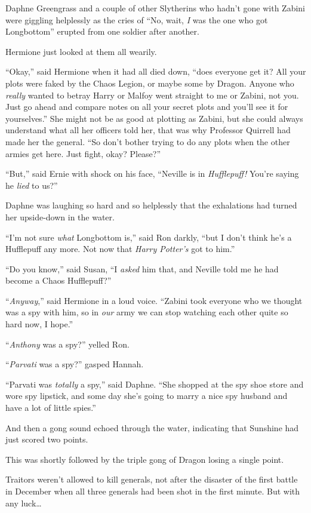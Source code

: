 Daphne Greengrass and a couple of other Slytherins who hadn’t gone with Zabini were giggling helplessly as the cries of “No, wait, \emph{I} was the one who got Longbottom” erupted from one soldier after another.

Hermione just looked at them all wearily.

“Okay,” said Hermione when it had all died down, “does everyone get it? All your plots were faked by the Chaos Legion, or maybe some by Dragon. Anyone who \emph{really} wanted to betray Harry or Malfoy went straight to me or Zabini, not you. Just go ahead and compare notes on all your secret plots and you’ll see it for yourselves.” She might not be as good at plotting as Zabini, but she could always understand what all her officers told her, that was why Professor Quirrell had made her the general. “So don’t bother trying to do any plots when the other armies get here. Just fight, okay? Please?”

“But,” said Ernie with shock on his face, “Neville is in \emph{Hufflepuff!} You’re saying he \emph{lied} to us?”

Daphne was laughing so hard and so helplessly that the exhalations had turned her upside-down in the water.

“I’m not sure \emph{what} Longbottom is,” said Ron darkly, “but I don’t think he’s a Hufflepuff any more. Not now that \emph{Harry Potter’s} got to him.”

“Do you know,” said Susan, “I \emph{asked} him that, and Neville told me he had become a Chaos Hufflepuff?”

“\emph{Anyway},” said Hermione in a loud voice. “Zabini took everyone who we thought was a spy with him, so in \emph{our} army we can stop watching each other quite so hard now, I hope.”

“\emph{Anthony} was a spy?” yelled Ron.

“\emph{Parvati} was a spy?” gasped Hannah.

“Parvati was \emph{totally} a spy,” said Daphne. “She shopped at the spy shoe store and wore spy lipstick, and some day she’s going to marry a nice spy husband and have a lot of little spies.”

And then a gong sound echoed through the water, indicating that Sunshine had just scored two points.

This was shortly followed by the triple gong of Dragon losing a single point.

Traitors weren’t allowed to kill generals, not after the disaster of the first battle in December when all three generals had been shot in the first minute. But with any luck…

